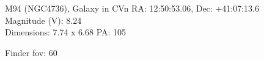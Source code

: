 \begin{block}{M94 (NGC4736), Galaxy in CVn}
    RA: 12:50:53.06, Dec: +41:07:13.6 \\ 
    Magnitude (V): 8.24 \\ 
    Dimensions: 7.74 x 6.68 PA: 105 

    Finder fov: 60 
\end{block}